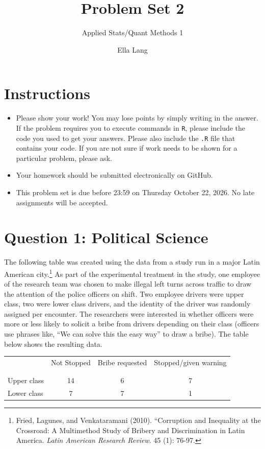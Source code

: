 \documentclass[12pt,letterpaper]{article}
\title{Problem Set 2}
\date{Ella Lang}
\author{Applied Stats/Quant Methods 1}
\begin{document}
	\maketitle
	\section*{Instructions}
\begin{itemize}
	\item Please show your work! You may lose points by simply writing in the answer. If the problem requires you to execute commands in \texttt{R}, please include the code you used to get your answers. Please also include the \texttt{.R} file that contains your code. If you are not sure if work needs to be shown for a particular problem, please ask.
	\item Your homework should be submitted electronically on GitHub.
	\item This problem set is due before 23:59 on Thursday October 22, 2026. No late assignments will be accepted.

\end{itemize}

	
	\vspace{.5cm}
	\section*{Question 1: Political Science}
		\vspace{.25cm}
	The following table was created using the data from a study run in a major Latin American city.\footnote{Fried, Lagunes, and Venkataramani (2010). ``Corruption and Inequality at the Crossroad: A Multimethod Study of Bribery and Discrimination in Latin America. \textit{Latin American Research Review}. 45 (1): 76-97.} As part of the experimental treatment in the study, one employee of the research team was chosen to make illegal left turns across traffic to draw the attention of the police officers on shift. Two employee drivers were upper class, two were lower class drivers, and the identity of the driver was randomly assigned per encounter. The researchers were interested in whether officers were more or less likely to solicit a bribe from drivers depending on their class (officers use phrases like, ``We can solve this the easy way'' to draw a bribe). The table below shows the resulting data.

\newpage
\begin{table}[h!]
	\centering
	\begin{tabular}{l | c c c }
		& Not Stopped & Bribe requested & Stopped/given warning \\
		\\[-1.8ex] 
		\hline \\[-1.8ex]
		Upper class & 14 & 6 & 7 \\
		Lower class & 7 & 7 & 1 \\
		\hline
	\end{tabular}
\end{table}
\end{document}
